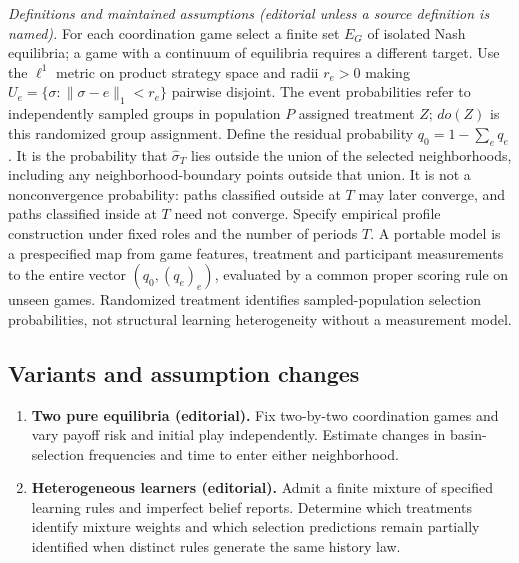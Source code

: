 \documentclass[11pt,a4paper]{article}
\begin{document}
\emph{Definitions and maintained assumptions (editorial unless a source definition is named).} For each coordination game select a finite set \(E_G\) of isolated Nash equilibria; a game with a continuum of equilibria requires a different target. Use the \(\ell^1\) metric on product strategy space and radii \(r_e>0\) making \(U_e=\{\sigma:\|\sigma-e\|_1<r_e\}\) pairwise disjoint. The event probabilities refer to independently sampled groups in population \(P\) assigned treatment \(Z\); \(do(Z)\) is this randomized group assignment. Define the residual probability \(q_0=1-\sum_e q_e\). It is the probability that \(\widehat\sigma_T\) lies outside the union of the selected neighborhoods, including any neighborhood-boundary points outside that union. It is not a nonconvergence probability: paths classified outside at \(T\) may later converge, and paths classified inside at \(T\) need not converge. Specify empirical profile construction under fixed roles and the number of periods \(T\). A portable model is a prespecified map from game features, treatment and participant measurements to the entire vector \((q_0,(q_e)_e)\), evaluated by a common proper scoring rule on unseen games. Randomized treatment identifies sampled-population selection probabilities, not structural learning heterogeneity without a measurement model.
\subsection*{Variants and assumption changes}
\begin{enumerate}
\item \textbf{Two pure equilibria (editorial).} Fix two-by-two coordination games and vary payoff risk and initial play independently. Estimate changes in basin-selection frequencies and time to enter either neighborhood.
\item \textbf{Heterogeneous learners (editorial).} Admit a finite mixture of specified learning rules and imperfect belief reports. Determine which treatments identify mixture weights and which selection predictions remain partially identified when distinct rules generate the same history law.
\end{enumerate}
\end{document}
